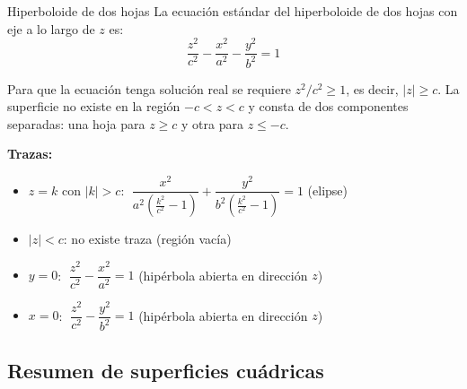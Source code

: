 \begin{mydefinition}{Hiperboloide de dos hojas}
La ecuación estándar del hiperboloide de dos hojas con eje a lo largo de $z$ es:
\[
\frac{z^2}{c^2} - \frac{x^2}{a^2} - \frac{y^2}{b^2} = 1
\]
\end{mydefinition}

Para que la ecuación tenga solución real se requiere $z^2/c^2 \geq 1$, es decir, $|z| \geq c$. La superficie no existe en la región $-c < z < c$ y consta de dos componentes separadas: una hoja para $z \geq c$ y otra para $z \leq -c$.

\textbf{Trazas:}
\begin{itemize}
    \item $z = k$ con $|k| > c$: $\;\dfrac{x^2}{a^2\!\left(\frac{k^2}{c^2}-1\right)} + \dfrac{y^2}{b^2\!\left(\frac{k^2}{c^2}-1\right)} = 1$ \quad (elipse)
    \item $|z| < c$: no existe traza (región vacía)
    \item $y = 0$: $\;\dfrac{z^2}{c^2} - \dfrac{x^2}{a^2} = 1$ \quad (hipérbola abierta en dirección $z$)
    \item $x = 0$: $\;\dfrac{z^2}{c^2} - \dfrac{y^2}{b^2} = 1$ \quad (hipérbola abierta en dirección $z$)
\end{itemize}

\begin{center}
\end{center}

\subsection{Resumen de superficies cuádricas}

